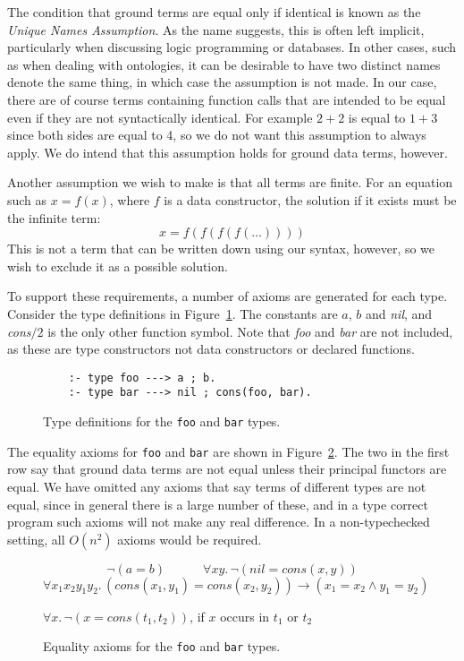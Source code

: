 The condition that ground terms are equal only if identical
is known as the \emph{Unique Names Assumption\label{gi:una}}.
As the name suggests, this is often left implicit,
particularly when discussing logic programming or databases.
In other cases, such as when dealing with ontologies,
it can be desirable to have two distinct names denote the same thing,
in which case the assumption is not made.
In our case,
there are of course terms containing function calls
that are intended to be equal even if they are not syntactically identical.
For example $2 + 2$ is equal to $1 + 3$
since both sides are equal to 4,
so we do not want this assumption to always apply.
We do intend that this assumption holds for ground data terms, however.

Another assumption we wish to make is that all terms are finite.
For an equation such as $x = f(x)$,
where $f$ is a data constructor,
the solution if it exists must be the infinite term:
\[ x = f(f(f(f(\ldots)))) \]
This is not a term that can be written down using our syntax, however,
so we wish to exclude it as a possible solution.

To support these requirements,
a number of axioms are generated for each type.
Consider the type definitions in Figure~\ref{fig:decl-foobar}.
The constants are $a$, $b$ and \textit{nil},
and \textit{cons}$/2$ is the only other function symbol.
Note that \textit{foo} and \textit{bar} are not included,
as these are type constructors not data constructors
or declared functions.

\begin{figure}
\begin{verbatim}
    :- type foo ---> a ; b.
    :- type bar ---> nil ; cons(foo, bar).
\end{verbatim}
\caption{Type definitions for the \texttt{foo} and \texttt{bar} types.
\label{fig:decl-foobar}}
\end{figure}

The equality axioms for \texttt{foo} and \texttt{bar}
are shown in Figure~\ref{fig:ax-foobar}.
The two in the first row say that
ground data terms are not equal
unless their principal functors are equal.
We have omitted any axioms that say
terms of different types are not equal,
since in general there is a large number of these,
and in a type correct program
such axioms will not make any real difference.
In a non-typechecked setting,
all $O(n^2)$ axioms would be required.

\begin{figure}
\[
\lnot (a = b)
\qquad\quad
\forall x y.\, \lnot (\mathit{nil} = \mathit{cons}(x, y))
\]
\[
\forall x_1 x_2 y_1 y_2.\,
(\mathit{cons}(x_1, y_1) = \mathit{cons}(x_2, y_2))
\rightarrow
(x_1 = x_2 \land y_1 = y_2)
\]
\begin{center}
$\forall x.\, \lnot (x = \mathit{cons}(t_1, t_2))$,
if $x$ occurs in $t_1$ or $t_2$
\end{center}
\caption{Equality axioms for the \texttt{foo} and \texttt{bar} types.
\label{fig:ax-foobar}}
\end{figure}

